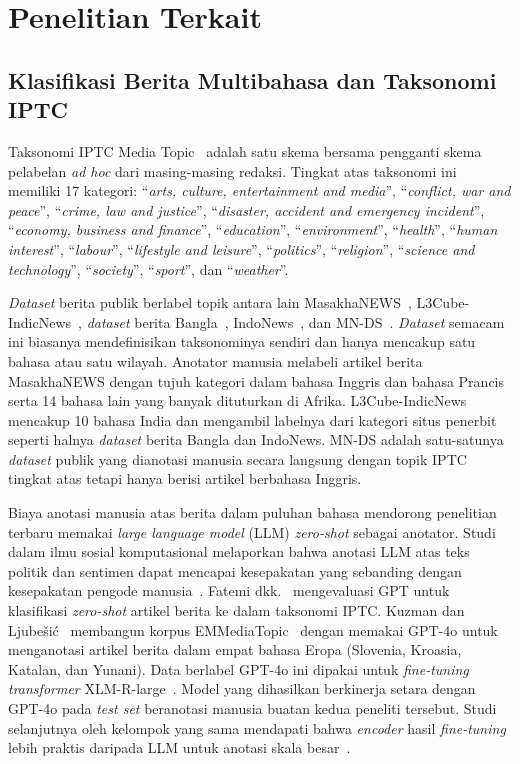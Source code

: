 \documentclass{ieeeaccess}
\newcommand{\en}[1]{\textit{#1}}
\begin{document}
\section{Penelitian Terkait}
\label{sec:related}
\subsection{Klasifikasi Berita Multibahasa dan Taksonomi IPTC}
\label{sec:rw-iptc}
Taksonomi IPTC Media Topic~\cite{iptc2024mediatopics} adalah satu skema bersama pengganti skema pelabelan \en{ad hoc} dari masing-masing redaksi. Tingkat atas taksonomi ini memiliki 17 kategori: ``\emph{arts, culture, entertainment and media}'', ``\emph{conflict, war and peace}'', ``\emph{crime, law and justice}'', ``\emph{disaster, accident and emergency incident}'', ``\emph{economy, business and finance}'', ``\emph{education}'', ``\emph{environment}'', ``\emph{health}'', ``\emph{human interest}'', ``\emph{labour}'', ``\emph{lifestyle and leisure}'', ``\emph{politics}'', ``\emph{religion}'', ``\emph{science and technology}'', ``\emph{society}'', ``\emph{sport}'', dan ``\emph{weather}''.

\en{Dataset} berita publik berlabel topik antara lain MasakhaNEWS~\cite{adelani2023masakhanews}, L3Cube-IndicNews~\cite{mirashi2023indicnews}, \en{dataset} berita Bangla~\cite{hossain2025banglanews}, IndoNews~\cite{indonews2021}, dan MN-DS~\cite{petukhova2023mnds}. \en{Dataset} semacam ini biasanya mendefinisikan taksonominya sendiri dan hanya mencakup satu bahasa atau satu wilayah. Anotator manusia melabeli artikel berita MasakhaNEWS dengan tujuh kategori dalam bahasa Inggris dan bahasa Prancis serta 14 bahasa lain yang banyak dituturkan di Afrika. L3Cube-IndicNews mencakup 10 bahasa India dan mengambil labelnya dari kategori situs penerbit seperti halnya \en{dataset} berita Bangla dan IndoNews. MN-DS adalah satu-satunya \en{dataset} publik yang dianotasi manusia secara langsung dengan topik IPTC tingkat atas tetapi hanya berisi artikel berbahasa Inggris.

Biaya anotasi manusia atas berita dalam puluhan bahasa mendorong penelitian terbaru memakai \en{large language model} (LLM) \en{zero-shot} sebagai anotator. Studi dalam ilmu sosial komputasional melaporkan bahwa anotasi LLM atas teks politik dan sentimen dapat mencapai kesepakatan yang sebanding dengan kesepakatan pengode manusia~\cite{heseltine2024llmannotation,bojic2025llmvshuman}. Fatemi dkk.~\cite{fatemi2023gptiptc} mengevaluasi GPT untuk klasifikasi \en{zero-shot} artikel berita ke dalam taksonomi IPTC. Kuzman dan Ljube\v{s}i\'c~\cite{kuzman2025llm} membangun korpus EMMediaTopic~\cite{emmediatopic2025} dengan memakai GPT-4o untuk menganotasi artikel berita dalam empat bahasa Eropa (Slovenia, Kroasia, Katalan, dan Yunani). Data berlabel GPT-4o ini dipakai untuk \en{fine-tuning} \en{transformer} XLM-R-large~\cite{conneau2020xlmr}. Model yang dihasilkan berkinerja setara dengan GPT-4o pada \en{test set} beranotasi manusia buatan kedua peneliti tersebut. Studi selanjutnya oleh kelompok yang sama mendapati bahwa \en{encoder} hasil \en{fine-tuning} lebih praktis daripada LLM untuk anotasi skala besar~\cite{kuzman2025southslavic}.
\end{document}
